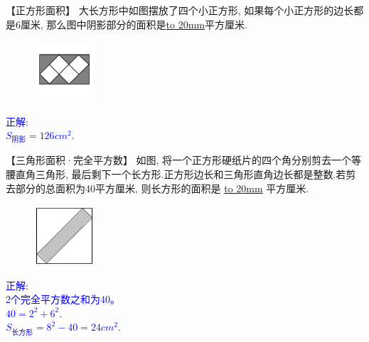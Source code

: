 \item {
    【正方形面积】
    大长方形中如图摆放了四个小正方形, 如果每个小正方形的边长都是6厘米, 那么图中阴影部分的面积是\underline{\hbox to 20mm{}}平方厘米.
    \begin{figure}[H] 
        \centering
        \includegraphics[width=0.2\textwidth]{./pics/Chapter_2/19.png}
    \end{figure}
    \ifshowSolution 
        \fangsong{}\textcolor{blue}{
            正解: \\
            $S_{阴影} = 126 {cm}^2$.
        }
    \else
        \vspace{1cm}
    \fi
}

\item {
    【三角形面积·完全平方数】
    {如图, 将一个正方形硬纸片的四个角分别剪去一个等腰直角三角形, 最后剩下一个长方形.正方形边长和三角形直角边长都是整数.若剪去部分的总面积为40平方厘米, 则长方形的面积是 \underline{\hbox to 20mm{}} 平方厘米.} 
    \begin{figure}[H] 
        \centering
        \includegraphics[width=0.2\textwidth]{./pics/Chapter_2/12.png}
    \end{figure}
    \ifshowSolution 
        \fangsong{}\textcolor{blue}{
            正解: \\
            2个完全平方数之和为40。\\
            $40 = 2^2 + 6^2$.\\
            $S_{长方形} = 8^2 - 40 = 24 {cm}^2$.
        }
    \else
        \vspace{1cm}
    \fi
}


